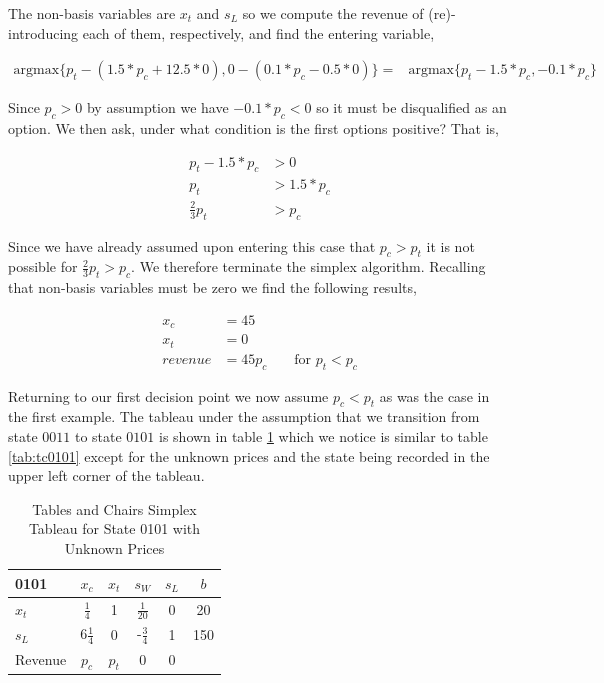 The non-basis variables are $x_t$ and $s_L$ so we compute the revenue
of (re)-introducing each of them, respectively, and find the entering variable,

\begin{align*}
   \text{argmax}\{p_t - (1.5*p_c + 12.5*0), 0 - (0.1*p_c - 0.5*0)\}
= &\text{argmax}\{p_t - 1.5*p_c , - 0.1*p_c\}
\end{align*}

Since $p_c > 0$ by assumption we have $-0.1*p_c < 0$ so it must be
disqualified as an option. We then ask, under what condition is the
first options positive? That is,

\begin{align*}
p_t - 1.5*p_c &> 0\\
p_t &> 1.5*p_c\\
\frac{2}{3}p_t &> p_c
\end{align*}

Since we have already assumed upon entering this case that $p_c > p_t$
it is not possible for $\frac{2}{3}p_t > p_c$. We therefore terminate
the simplex algorithm. Recalling that non-basis variables must be zero
we find the following results,

\begin{align*}
x_c &= 45\\
x_t &= 0\\
revenue &= 45p_c && \text{ for } p_t < p_c
\end{align*}

Returning to our first decision point we now assume $p_c < p_t$ as was
the case in the first example. The tableau under the assumption that
we transition from state $0011$ to state $0101$ is shown in table
\ref{tab:tcp0101} which we notice is similar to table
\ref{tab:tc0101} except for the unknown prices and the state being
recorded in the upper left corner of the tableau.

\begin{table}
\centering
\begin{tabular}{| l | c c c c | c |}
\hline
0101    & $x_c$ & $x_t$ & $s_W$ & $s_L$ & $b$\\
\hline
$x_t$   & $\frac{1}{4}$     & 1    & $\frac{1}{20}$     & 0     & 20\\
$s_L$   & 6$\frac{1}{4}$    & 0    & -$\frac{3}{4}$     & 1     & 150\\
\hline
Revenue & $p_c$   & $p_t$    & 0     & 0     &\\
\hline
\end{tabular}
  \caption[Tables and Chairs Simplex Tableau for State 0101 with Unknown Prices]
          {Tables and Chairs Simplex Tableau for State 0101 with Unknown Prices}
  \label{tab:tcp0101}
\end{table}

